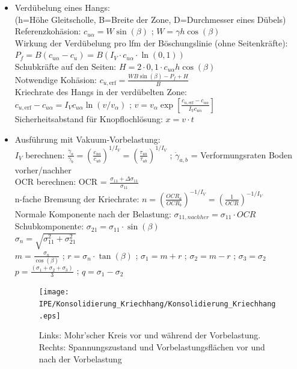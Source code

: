 \documentclass[fleqn,twoside]{article}
\begin{document}
\begin{enumerate}
\begin{itemize}
		\item Verdübelung eines Hangs:\\
		(h=Höhe Gleitscholle, B=Breite der Zone, D=Durchmesser eines Dübels)\\
		Referenzkohäsion: $c_{u\alpha}=W\sin(\beta)$ ; $W=\gamma h \cos(\beta)$\\
		Wirkung der Verdübelung pro lfm der Böschungslinie (ohne Seitenkräfte): \\ 
			\hspace*{1cm} $P_f=B(c_{u\alpha}-c_u)=B(I_V \cdot c_{u\alpha} \cdot \ln(0,1))$\\
		Schubkräfte auf den Seiten: $H=2 \cdot 0,1 \cdot c_{u\alpha} h \cos(\beta)$\\
		Notwendige Kohäsion: $c_{u,\text{erf}}=\frac{WB\sin(\beta)-P_f+H}{B}$\\
		Kriechrate des Hangs in der verdübelten Zone:\\ \hspace*{1cm} $c_{u,\text{erf}} - c_{u\alpha} = I_V c_{u\alpha} \ln(v/v_\alpha)$ ; 
			 $v=v_\alpha \exp\left[\frac{c_{u,\text{erf}}-c_{u\alpha}}{I_Vc_{u\alpha}}\right]$\\
		Sicherheitsabstand für Knopflochlösung: $x=v\cdot t$\\
		
		\item Ausführung mit Vakuum-Vorbelastung:\\
		$I_V$ berechnen: $\frac{\dot{\gamma}_a}{\dot{\gamma}_b} = (\frac{c_{ua}}{c_{ub}})^{1/I_V}=(\frac{\tau_{ua}}{\tau_{ub}})^{1/I_V}$ ; $\dot{\gamma}_{a,b}$ = Verformungsraten Boden vorher/nachher\\
		OCR berechnen: OCR = $\frac{\sigma_{11}+\Delta \sigma_{11}}{\sigma_{11}}$\\
		n-fache Bremsung der Kriechrate: $n = (\frac{OCR_a}{OCR_b})^{-1/I_V}= (\frac{1}{OCR})^{-1/I_V}$\\
		Normale Komponente nach der Belastung: $\sigma_{11,nachher}=\sigma_{11} \cdot OCR$\\
		Schubkomponente: $\sigma_{21} = \sigma_{11} \cdot \sin(\beta)$\\
		$\sigma_n = \sqrt{\sigma_{11}^2 + \sigma_{21}^2}$\\
		$m=\frac{\sigma_n}{\cos(\beta)}$ ; $r=\sigma_n \cdot \tan(\beta)$ ; $\sigma_1=m+r$ ; $\sigma_2=m-r$ ; $\sigma_3 = \sigma_2$\\
		$p=\frac{(\sigma_1+\sigma_2+\sigma_3)}{3}$ ; $q=\sigma_1-\sigma_2$\\
\begin{figure}[ht]		
		\texttt{[image: IPE/Konsolidierung\_Kriechhang/Konsolidierung\_Kriechhang.eps]}
		\caption{Links: Mohr'scher Kreis vor und während der Vorbelastung.\\ 
		Rechts: Spannungszustand und Vorbelastungsflächen vor und nach der Vorbelastung}
\end{figure}

		\end{itemize}
	


\end{enumerate}
\end{document}
